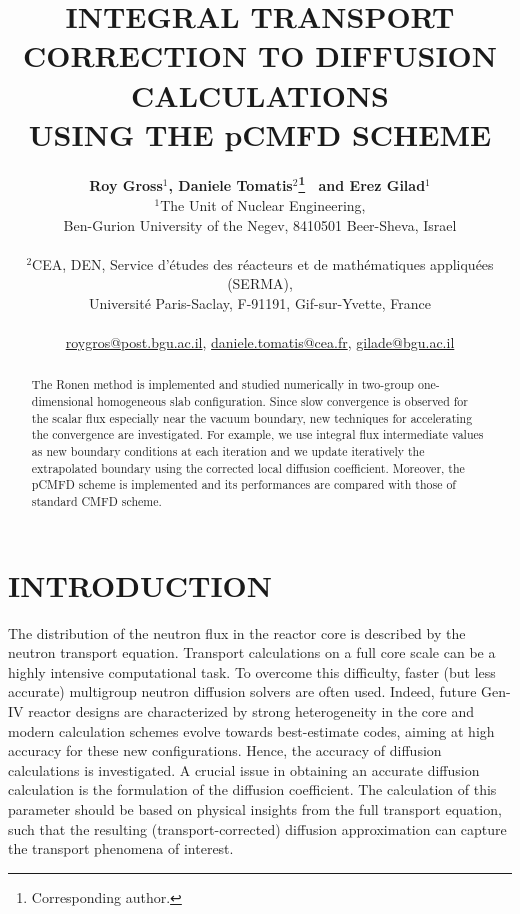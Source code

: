 \documentclass[letterpaper]{physor2020}
\title{INTEGRAL TRANSPORT CORRECTION TO DIFFUSION CALCULATIONS\\
       USING THE pCMFD SCHEME}
\author{%
  \textbf{Roy Gross$^1$,
          Daniele Tomatis$^2$\footnote{Corresponding author.}
          ~and Erez Gilad$^1$} \\
  $^1$The Unit of Nuclear Engineering, \\
  Ben-Gurion University of the Negev, 8410501 Beer-Sheva, Israel \\
\\
  $^2$CEA, DEN, Service d’\'etudes des r\'eacteurs et
      de math\'ematiques appliqu\'ees (SERMA), \\
    Universit\'e Paris-Saclay, F-91191, Gif-sur-Yvette, France \\
\\
  \url{roygros@post.bgu.ac.il},
  \url{daniele.tomatis@cea.fr},
  \url{gilade@bgu.ac.il}
}
\begin{document}
\maketitle
\justify

\begin{abstract}
  The Ronen method is implemented and studied numerically in two-group one-dimensional homogeneous slab configuration. Since slow convergence is observed for the scalar flux especially near the vacuum boundary, new techniques for accelerating the convergence are investigated. For example, we use integral flux intermediate values as new boundary conditions at each iteration and we update iteratively the extrapolated boundary using the corrected local diffusion coefficient. Moreover, the pCMFD scheme is implemented and its performances are compared with those of standard CMFD scheme.
\end{abstract}

\section{INTRODUCTION}
\label{sec:intro}

The distribution of the neutron flux in the reactor core is described by the neutron transport equation. Transport calculations on a full core scale can be a highly intensive computational task. To overcome this difficulty, faster (but less accurate) multigroup neutron diffusion solvers are often used. Indeed, future Gen-IV reactor designs are characterized by strong heterogeneity in the core and modern calculation schemes evolve towards best-estimate codes, aiming at high accuracy for these new configurations. Hence, the accuracy of diffusion calculations is investigated. A crucial issue in obtaining an accurate diffusion calculation is the formulation of the diffusion coefficient. The calculation of this parameter should be based on physical insights from the full transport equation, such that the resulting (transport-corrected) diffusion approximation can capture the transport phenomena of interest.
\end{document}
